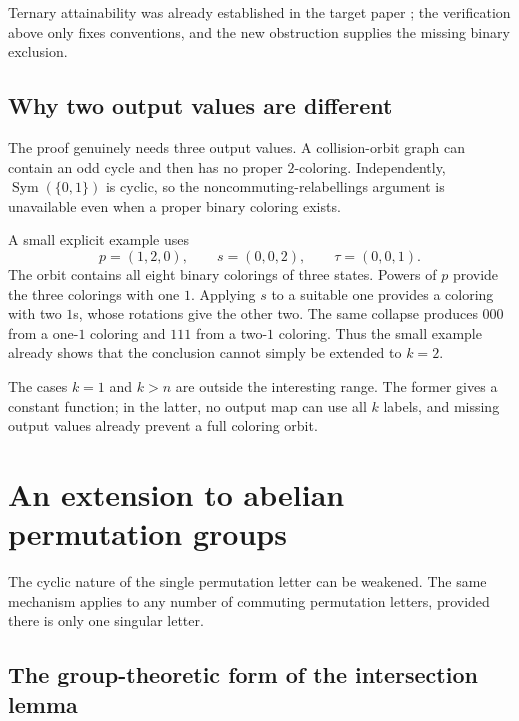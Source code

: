 \documentclass[11pt,a4paper]{article}
\numberwithin{equation}{section}
\theoremstyle{definition}
\theoremstyle{remark}
\newcommand{\Sym}{\operatorname{Sym}}
\begin{document}
Ternary attainability was already established
in the target paper \cite[Theorem~1 and Corollary~2]{Davies2017}; the
verification above only fixes conventions, and the new obstruction supplies
the missing binary exclusion.

\subsection{Why two output values are different}\label{sec:kis2}

The proof genuinely needs three output values. A collision-orbit graph can
contain an odd cycle and then has no proper $2$-coloring. Independently,
$\Sym(\{0,1\})$ is cyclic, so the noncommuting-relabellings argument is
unavailable even when a proper binary coloring exists.

A small explicit example uses
\[
 p=(1,2,0),\qquad s=(0,0,2),\qquad\tau=(0,0,1).
\]
The orbit contains all eight binary colorings of three states. Powers of $p$
provide the three colorings with one $1$. Applying $s$ to a suitable one
provides a coloring with two $1$s, whose rotations give the other two.
The same collapse produces $000$ from a one-$1$ coloring and $111$ from a
two-$1$ coloring. Thus the small example already shows that the conclusion
cannot simply be extended to $k=2$.

The cases $k=1$ and $k>n$ are outside the interesting range. The former gives
a constant function; in the latter, no output map can use all $k$ labels,
and missing output values already prevent a full coloring orbit.

\section{An extension to abelian permutation groups}\label{sec:abelian}

The cyclic nature of the single permutation letter can be weakened. The
same mechanism applies to any number of commuting permutation letters,
provided there is only one singular letter.

\subsection{The group-theoretic form of the intersection lemma}
\end{document}
